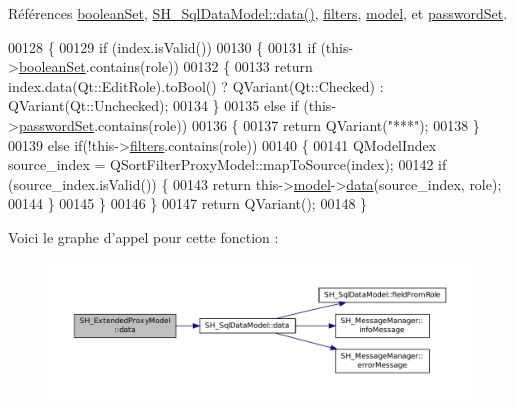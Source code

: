 Références \hyperlink{classSH__ExtendedProxyModel_a7dd9cf1dd153b98220d217e9be1f0916}{boolean\-Set}, \hyperlink{classSH__SqlDataModel_a30cc763618d73a1bb5410c84812c0b9f}{S\-H\-\_\-\-Sql\-Data\-Model\-::data()}, \hyperlink{classSH__ExtendedProxyModel_a99a5c4c6b9d125c87f048c76d22278d3}{filters}, \hyperlink{classSH__ExtendedProxyModel_a8c8b8930c6b1abd9bbb1dce1fdc9690b}{model}, et \hyperlink{classSH__ExtendedProxyModel_a9616e7be442b560e260e1db9034143bc}{password\-Set}.


\begin{DoxyCode}
00128 \{
00129     \textcolor{keywordflow}{if} (index.isValid())
00130     \{
00131         \textcolor{keywordflow}{if} (this->\hyperlink{classSH__ExtendedProxyModel_a7dd9cf1dd153b98220d217e9be1f0916}{booleanSet}.contains(role))
00132         \{
00133             \textcolor{keywordflow}{return} index.data(Qt::EditRole).toBool() ? QVariant(Qt::Checked) : QVariant(Qt::Unchecked);
00134         \}
00135         \textcolor{keywordflow}{else} \textcolor{keywordflow}{if} (this->\hyperlink{classSH__ExtendedProxyModel_a9616e7be442b560e260e1db9034143bc}{passwordSet}.contains(role))
00136         \{
00137             \textcolor{keywordflow}{return} QVariant(\textcolor{stringliteral}{"***"});
00138         \}
00139         \textcolor{keywordflow}{else} \textcolor{keywordflow}{if}(!this->\hyperlink{classSH__ExtendedProxyModel_a99a5c4c6b9d125c87f048c76d22278d3}{filters}.contains(role))
00140         \{
00141             QModelIndex source\_index = QSortFilterProxyModel::mapToSource(index);
00142             \textcolor{keywordflow}{if} (source\_index.isValid()) \{
00143                 \textcolor{keywordflow}{return} this->\hyperlink{classSH__ExtendedProxyModel_a8c8b8930c6b1abd9bbb1dce1fdc9690b}{model}->\hyperlink{classSH__SqlDataModel_a30cc763618d73a1bb5410c84812c0b9f}{data}(source\_index, role);
00144             \}
00145         \}
00146     \}
00147     \textcolor{keywordflow}{return} QVariant();
00148 \}
\end{DoxyCode}


Voici le graphe d'appel pour cette fonction \-:\nopagebreak
\begin{figure}[H]
\begin{center}
\leavevmode
\includegraphics[width=350pt]{classSH__ExtendedProxyModel_afbc947efbe1107fc5bf8926c52902a1c_cgraph}
\end{center}
\end{figure}


